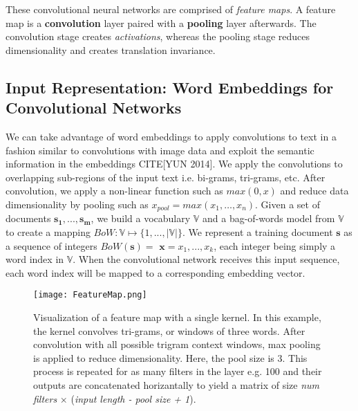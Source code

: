These convolutional neural networks are comprised of \textit{feature maps}. A feature map is a \textbf{convolution} layer paired with a
\textbf{pooling} layer afterwards. The convolution stage creates \textit{activations}, whereas the pooling stage
reduces dimensionality and creates translation invariance.


\subsection{Input Representation: Word Embeddings for Convolutional Networks}
We can take advantage of word embeddings to apply convolutions to text in a fashion similar to convolutions with
image data and exploit the semantic information in the embeddings CITE[YUN 2014]. We apply the convolutions to overlapping sub-regions of the input text i.e. bi-grams, tri-grams, etc.
After convolution, we apply a non-linear function such as $max(0,x)$ and reduce data dimensionality
by pooling such as $x_{pool} = max(x_1,\dots,x_n)$.
Given a set of documents $\bm{s_1},...,\bm{s_m}$, we build a vocabulary $\mathbb{V}$ and a bag-of-words model from $\mathbb{V}$ to create a mapping $BoW:\mathbb{V} \mapsto \{1,...,|\mathbb{V}|\}$.
We represent a training document $\bm{s}$ as a sequence of integers $BoW(\bm{s})=$ $\bm{x} = x_1,...,x_k$, each integer being simply a word index
in $\mathbb{V}$. When the convolutional network receives this input sequence, each word index will be mapped to a corresponding embedding vector.

\begin{figure}[H]
\caption{Visualization of a feature map with a single kernel. In this example, the kernel convolves tri-grams, or windows of three words.
After convolution with all possible trigram context windows, max pooling is applied to reduce dimensionality.
Here, the pool size is 3. This process is repeated for as many filters in the layer e.g. 100 and their outputs are
concatenated horizantally to yield a matrix of size \textit{num filters} $\times$ (\textit{input length - pool size + 1}).}
\centering
\texttt{[image: FeatureMap.png]}
\end{figure}
